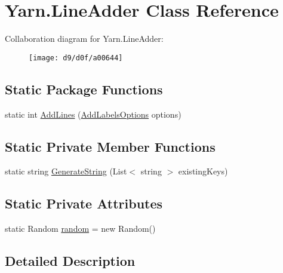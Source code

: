 \hypertarget{a00104}{\section{Yarn.\-Line\-Adder Class Reference}
\label{a00104}
}


Collaboration diagram for Yarn.\-Line\-Adder\-:
\nopagebreak
\begin{figure}[H]
\begin{center}
\leavevmode
\texttt{[image: d9/d0f/a00644]}
\end{center}
\end{figure}
\subsection*{Static Package Functions}
\begin{DoxyCompactItemize}
\item 
static int \hyperlink{a00104_aa2b8af349e709b8a45d42af5146ca848}{Add\-Lines} (\hyperlink{a00019}{Add\-Labels\-Options} options)
\end{DoxyCompactItemize}
\subsection*{Static Private Member Functions}
\begin{DoxyCompactItemize}
\item 
static string \hyperlink{a00104_a91ad68b679bd3b0bd89fe92ea5068688}{Generate\-String} (List$<$ string $>$ existing\-Keys)
\end{DoxyCompactItemize}
\subsection*{Static Private Attributes}
\begin{DoxyCompactItemize}
\item 
static Random \hyperlink{a00104_ad887744b1b813fc081be814958742c37}{random} = new Random()
\end{DoxyCompactItemize}


\subsection{Detailed Description}


